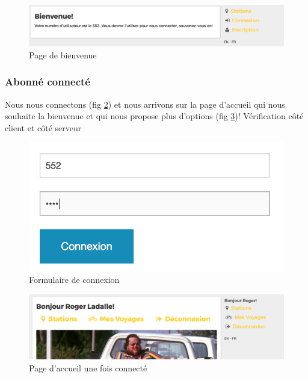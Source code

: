 \documentclass[a4paper]{article}
\begin{document}
    \begin{figure}
	\includegraphics[width=\textwidth]{s5.png}
    \caption{Page de bienvenue}
    \label{fig-s5}
	\end{figure}
    
    \subsubsection{Abonné connecté}
    Nous nous connectons (fig \ref{fig-s6}) et nous arrivons sur la page d'accueil qui nous souhaite la bienvenue et qui nous propose plus d'options (fig \ref{fig-s7})!
    Vérification côté client et côté serveur
    
    \begin{figure}
    \begin{center}
	\includegraphics[width=\textwidth/3]{s6.png}
    \end{center}
    \caption{Formulaire de connexion}
    \label{fig-s6}
	\end{figure}
    
    \begin{figure}
	\includegraphics[width=\textwidth]{s7.png}
    \caption{Page d'accueil une fois connecté}
    \label{fig-s7}
	\end{figure}
    
\end{document}

